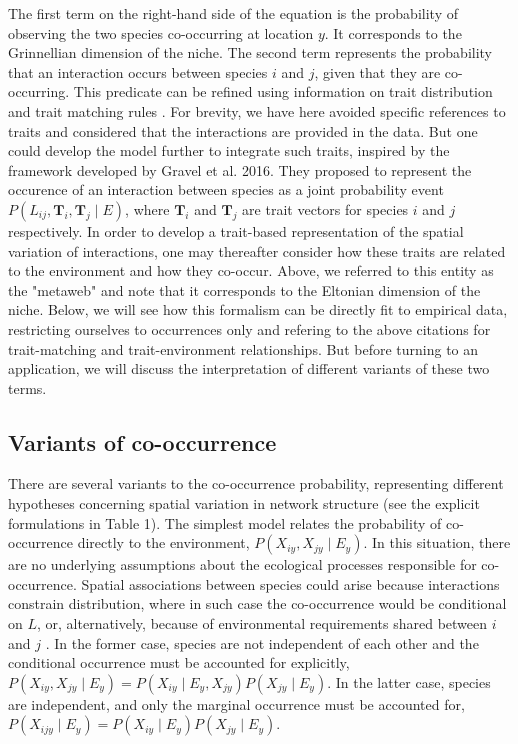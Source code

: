 \documentclass[12pt]{article}
\begin{document}
The first term on the right-hand side of the equation is the probability of
observing the two species co-occurring at location $y$. It corresponds to the
Grinnellian dimension of the niche. The second term represents the probability
that an interaction occurs between species $i$ and $j$, given that they are
co-occurring. This predicate can be refined using information on trait
distribution and trait matching rules . For brevity, we have here avoided
specific references to traits and considered that the interactions are
provided in the data. But one could develop the model further to integrate
such traits, inspired by the framework developed by Gravel et al. 2016. They
proposed to represent the occurence of an interaction between species as a
joint probability event $P(L_{ij}, \mathbf{T}_i, \mathbf{T}_j\mid E)$, where
$\mathbf{T}_i$ and $\mathbf{T}_j$ are trait vectors for species $i$ and $j$
respectively. In order to develop a trait-based representation of the spatial
variation of interactions, one may thereafter consider how these traits are
related to the environment and how they co-occur. Above, we referred to this
entity as the "metaweb" and note that it corresponds to the Eltonian dimension
of the niche. Below, we will see how this formalism can be directly fit to
empirical data, restricting ourselves to occurrences only and refering to the
above citations for trait-matching and trait-environment relationships. But
before turning to an application, we will discuss the interpretation of
different variants of these two terms.

\subsection*{Variants of co-occurrence}

There are several variants to the co-occurrence probability, representing
different hypotheses concerning spatial variation in network structure (see
the explicit formulations in Table 1). The simplest model relates the
probability of co-occurrence directly to the environment,
$P(X_{iy},X_{jy}\mid E_y)$. In this situation, there are no underlying assumptions
about the ecological processes responsible for co-occurrence. Spatial associations between species could arise
because interactions constrain distribution, where in such case the co-occurrence would be conditional on $L$, or, alternatively, because of
environmental requirements shared between $i$ and $j$ \citep{Pollock2014,
Cazelles2016}. In the former case, species are not independent of each other
and the conditional occurrence must be accounted for explicitly,
$P(X_{iy},X_{jy} \mid E_y)=P(X_{iy}\mid E_y,X_{jy})P(X_{jy}\mid E_y)$. In the latter case,
species are independent, and only the marginal occurrence must be accounted
for, $P( X_{ijy}\mid E_y)=P(X_{iy} \mid E_y)P(X_{jy} \mid E_y)$.
\end{document}
